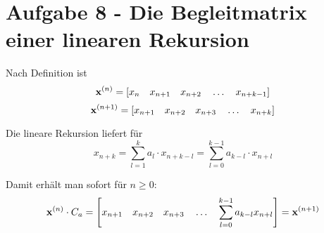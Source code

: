 \section*{Aufgabe 8 - Die Begleitmatrix einer linearen Rekursion}

\begin{flushalphb}

\item
	Nach Definition ist
	\[ {\bf x}^{(n)} = \left[ x_n \quad x_{n+1} \quad x_{n+2} \quad \ldots \quad x_{n+k-1} \right] \]
	\[ {\bf x}^{(n+1)} =  \left[ x_{n+1} \quad x_{n+2} \quad x_{n+3} \quad \ldots \quad x_{n+k} \right] \]

	Die lineare Rekursion liefert für 
	\[ x_{n+k} = \sum_{l = 1}^{k} a_l \cdot x_{n+k-l} = \sum_{l=0}^{k-1} a_{k-l} \cdot x_{n+l} \]

	Damit erhält man sofort für $n \geq 0$:
	\[ {\bf x}^{(n)} \cdot C_a = \left[  x_{n+1} \quad x_{n+2} \quad
	x_{n+3} \quad \ldots \quad \sum_{l=0}^{k-1} a_{k-l} x_{n+l} \right] =
	{\bf x}^{(n+1)} \]


\end{flushalphb}
